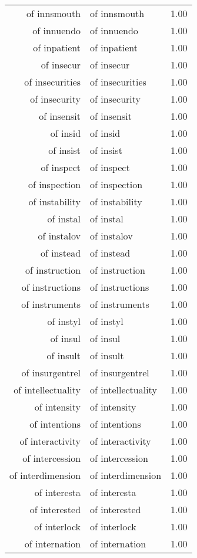 \begin{table}[ht]
\begin{tabular}{rlr}
  of innsmouth & of innsmouth & 1.00 \\ 
  of innuendo & of innuendo & 1.00 \\ 
  of inpatient & of inpatient & 1.00 \\ 
  of insecur & of insecur & 1.00 \\ 
  of insecurities & of insecurities & 1.00 \\ 
  of insecurity & of insecurity & 1.00 \\ 
  of insensit & of insensit & 1.00 \\ 
  of insid & of insid & 1.00 \\ 
  of insist & of insist & 1.00 \\ 
  of inspect & of inspect & 1.00 \\ 
  of inspection & of inspection & 1.00 \\ 
  of instability & of instability & 1.00 \\ 
  of instal & of instal & 1.00 \\ 
  of instalov & of instalov & 1.00 \\ 
  of instead & of instead & 1.00 \\ 
  of instruction & of instruction & 1.00 \\ 
  of instructions & of instructions & 1.00 \\ 
  of instruments & of instruments & 1.00 \\ 
  of instyl & of instyl & 1.00 \\ 
  of insul & of insul & 1.00 \\ 
  of insult & of insult & 1.00 \\ 
  of insurgentrel & of insurgentrel & 1.00 \\ 
  of intellectuality & of intellectuality & 1.00 \\ 
  of intensity & of intensity & 1.00 \\ 
  of intentions & of intentions & 1.00 \\ 
  of interactivity & of interactivity & 1.00 \\ 
  of intercession & of intercession & 1.00 \\ 
  of interdimension & of interdimension & 1.00 \\ 
  of interesta & of interesta & 1.00 \\ 
  of interested & of interested & 1.00 \\ 
  of interlock & of interlock & 1.00 \\ 
  of internation & of internation & 1.00 \\ 

\end{tabular}
\end{table}

